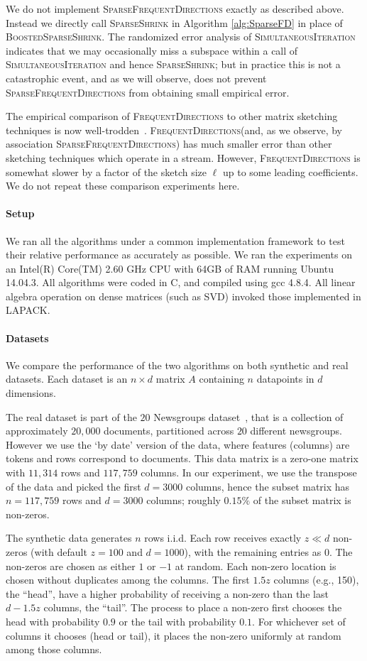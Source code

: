 \documentclass[11pt]{article}
\newcommand{\fd}{\textsc{FrequentDirections}\xspace}
\newcommand{\sfd}{\textsc{SparseFrequentDirections}\xspace}
\newcommand{\si}{\textsc{SimultaneousIteration}\xspace}
\newcommand{\SSh}{\textsc{SparseShrink}\xspace}
\newcommand{\BSSh}{\textsc{BoostedSparseShrink}\xspace}
\newcommand{\Paragraph}[1]{\paragraph*{\sffamily \textbf{#1}}}
\begin{document}
We do not implement \sfd exactly as described above.  Instead we directly call \SSh in Algorithm \ref{alg:SparseFD} in place of \BSSh.  The randomized error analysis of \si indicates that we may occasionally miss a subspace within a call of \si and hence \SSh; but in practice this is not a catastrophic event, and as we will observe, does not prevent \sfd from obtaining small empirical error.  

The empirical comparison of \fd to other matrix sketching techniques is now well-trodden~\cite{ghashami2015frequent,desai2015improved}.  \fd (and, as we observe, by association \sfd) has much smaller error than other sketching techniques which operate in a stream.  However, \fd is somewhat slower by a factor of the sketch size $\ell$ up to some leading coefficients.  
We do not repeat these comparison experiments here.  

\Paragraph{Setup} 
We ran all the algorithms under a common implementation framework to test their relative performance as accurately as possible. We ran the experiments on an Intel(R) Core(TM) 2.60 GHz CPU with 64GB of RAM running Ubuntu 14.04.3. 
All algorithms were coded in C, and compiled using gcc 4.8.4.
All linear algebra operation on dense matrices (such as SVD) invoked those implemented in LAPACK. 

\Paragraph{Datasets} 
We compare the performance of the two algorithms on both synthetic and real datasets. Each dataset is an $n\times d$ matrix $A$ containing $n$ datapoints in $d$ dimensions. 

The real dataset is part of the $20$ Newsgroups dataset~\cite{Lang95}, that is a collection of approximately $20{,}000$ documents, partitioned across $20$ different newsgroups. However we use the `by date' version of the data, where features (columns) are tokens and rows correspond to documents. This data matrix is a zero-one matrix with $11{,}314$ rows and $117{,}759$ columns. In our experiment, we use the transpose of the data and picked the first $d = 3000$ columns, hence the subset matrix has $n = 117{,}759$ rows and $d = 3000$ columns; roughly $0.15\%$ of the subset matrix is non-zeros.


The synthetic data generates $n$ rows i.i.d.  
Each row receives exactly $z \ll d$ non-zeros (with default $z=100$ and $d=1000$), with the remaining entries as $0$.  
The non-zeros are chosen as either $1$ or $-1$ at random.  
Each non-zero location is chosen without duplicates among the columns. 
The first $1.5z$ columns (e.g., 150), the ``head'', have a higher probability of receiving a non-zero than the last $d-1.5z$ columns, the ``tail''.   The process to place a non-zero first chooses the head with probability $0.9$ or the tail with probability $0.1$.  For whichever set of columns it chooses (head or tail), it places the non-zero uniformly at random among those columns.  
\end{document}
